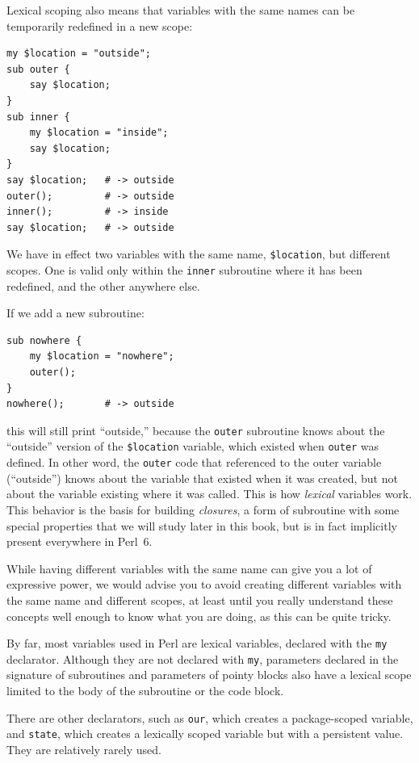 Lexical scoping also means that variables with the same names
can be temporarily redefined in a new scope: 

\begin{verbatim}
my $location = "outside";
sub outer {
    say $location;
}
sub inner {
    my $location = "inside";
    say $location;
}
say $location;   # -> outside
outer();         # -> outside
inner();         # -> inside
say $location;   # -> outside
\end{verbatim}
% 
We have in effect two variables with the same name, 
{\tt \$location}, but different scopes. One is valid only 
within the {\tt inner} subroutine where it has been redefined, 
and the other anywhere else.

If we add a new subroutine:
\begin{verbatim}
sub nowhere {
    my $location = "nowhere";
    outer();
}
nowhere();       # -> outside
\end{verbatim}
% 
this will still print ``outside,'' because the {\tt outer} 
subroutine knows about the ``outside'' version of the 
{\tt \$location} variable, which existed when {\tt outer} was defined.
In other word, the {\tt outer} code that referenced to the 
outer variable (``outside'') knows about the variable that existed 
when it was created, but not about the variable existing where 
it was called. This is how \emph{lexical} variables work. 
This behavior is the basis for building \emph{closures}, a  
form of subroutine with some special properties that we 
will study later in this book, but 
is in fact implicitly present everywhere in Perl~6.

While having different variables with the same name can give 
you a lot of expressive power, we would 
advise you to avoid creating different variables with the 
same name and different scopes, at least until you really understand 
these concepts well enough to know what you are doing, as this 
can be quite tricky.

By far, most variables used in Perl are lexical variables, 
declared with the {\tt my} declarator. Although they are 
not declared with {\tt my}, parameters declared 
in the signature of subroutines and parameters of pointy 
blocks also have a lexical scope limited to the body of the 
subroutine or the code block.

There are other declarators, such as {\tt our}, which creates 
a package-scoped variable, and {\tt state}, which creates a 
lexically scoped variable but with a persistent value. They 
are relatively rarely used.

